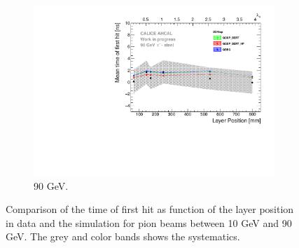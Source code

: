 \begin{figure}[htbp!]
\begin{subfigure}[t]{0.5\textwidth}
    \includegraphics[width=1\textwidth]{../Thesis_Plots/Timing/Pions/Plots/ComparisonToSim/Time_Depth_90GeV_DD4hep.pdf}
    \caption{90 GeV.} \label{fig:Depth_SimData_90GeV_DD4hep}
  \end{subfigure}
  \caption{Comparison of the time of first hit as function of the layer position in data and the \ddhep simulation for pion beams between 10 GeV and 90 GeV. The grey and color bands shows the systematics.}
\end{figure}


